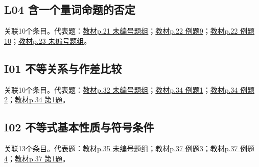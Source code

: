 \par\medskip\noindent\begin{minipage}{\linewidth}\subsection{L04 含一个量词命题的否定}关联10个条目。代表题：\hyperref[XJ-B1-C01-TH-P021-Y1462]{教材p.21 未编号题组}；\hyperref[XJ-B1-C01-EX-P022-Y0891]{教材p.22 例题9}；\hyperref[XJ-B1-C01-EX-P022-Y1296]{教材p.22 例题10}；\hyperref[XJ-B1-C01-PR-P023-Y0176]{教材p.23 未编号题组}。\end{minipage}\par
\par\medskip\noindent\begin{minipage}{\linewidth}\subsection{I01 不等关系与作差比较}关联10个条目。代表题：\hyperref[XJ-B1-C02-TH-P032-Y0904]{教材p.32 未编号题组}；\hyperref[XJ-B1-C02-EX-P034-Y0478]{教材p.34 例题1}；\hyperref[XJ-B1-C02-EX-P034-Y0712]{教材p.34 例题2}；\hyperref[XJ-B1-C02-PR-P034-Y1377]{教材p.34 第1题}。\end{minipage}\par
\par\medskip\noindent\begin{minipage}{\linewidth}\subsection{I02 不等式基本性质与符号条件}关联13个条目。代表题：\hyperref[XJ-B1-C02-TH-P035-Y0319]{教材p.35 未编号题组}；\hyperref[XJ-B1-C02-EX-P037-Y0431]{教材p.37 例题3}；\hyperref[XJ-B1-C02-EX-P037-Y0590]{教材p.37 例题4}；\hyperref[XJ-B1-C02-PR-P037-Y0875]{教材p.37 第1题}。\end{minipage}\par
